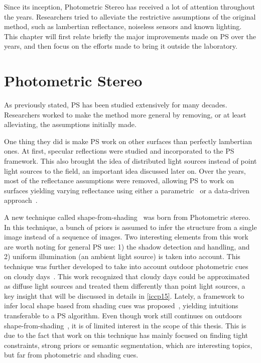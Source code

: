 \documentclass{report}
\begin{document}
Since its inception, Photometric Stereo has received a lot of attention throughout the years. Researchers tried to alleviate the restrictive assumptions of the original method, such as lambertian reflectance, noiseless sensors and known lighting. This chapter will first relate briefly the major improvements made on PS over the years, and then focus on the efforts made to bring it outside the laboratory.


\section{Photometric Stereo}

As previously stated, PS has been studied extensively for many decades. Researchers worked to make the method more general by removing, or at least alleviating, the assumptions initially made.

One thing they did is make PS work on other surfaces than perfectly lambertian ones. At first, specular reflections \cite{Ikeuchi1981} were studied and incorporated to the PS framework. This also brought the idea of distributed light sources instead of point light sources to the field, an important idea discussed later on. Over the years, most of the reflectance assumptions were removed, allowing PS to work on surfaces yielding varying reflectance using either a parametric~\cite{hertzmann-pami-05,goldman-tpami-10} or a data-driven approach~\cite{alldrin-cvpr-08}.

A new technique called shape-from-shading~\cite{Horn1989} was born from Photometric stereo. In this technique, a bunch of priors is assumed to infer the structure from a single image instead of a sequence of images. Two interesting elements from this work are worth noting for general PS use: 1) the shadow detection and handling, and 2) uniform illumination (an ambient light source) is taken into account. This technique was further developed to take into account outdoor photometric cues on cloudy days~\cite{Langer1994}. This work recognized that cloudy days could be approximated as diffuse light sources and treated them differently than point light sources, a key insight that will be discussed in details in \ref{iccp15}. Lately, a framework to infer local shape based from shading cues was proposed~\cite{Xiong2013}, yielding intuitions transferable to a PS algorithm. Even though work still continues on outdoors shape-from-shading~\cite{oxholm-eccv-12,johnson-cvpr-11,barron-pami-15}, it is of limited interest in the scope of this thesis. This is due to the fact that work on this technique has mainly focused on finding tight constraints, strong priors or semantic segmentation, which are interesting topics, but far from photometric and shading cues.
\end{document}
